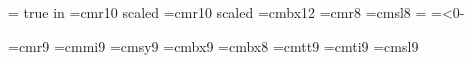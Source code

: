 %
%
\newif\iffiles
%
%
%
\newif\ifshutup\shutupfalse
\magnification=
 true in
\baselineskip
%
%
\def\PAR{\par}
%
%
\font\medfont=cmr10 scaled 
\font\bigfont=cmr10 scaled 
\font\sectfont=cmbx12
\def\small{\sevenrm}
\font\rhrm=cmr8
\font\rhit=cmsl8
%
%
\newcount\subsectno    %
\def\rhead{}           %
%
\def\newsection#1#2{%
\xdef\rhead{{\rhrm #1}\quad #2}%
\subsectno=0%
\iffiles
\write\conts{\string\sli\string{#1\string}\string{#2\string}\string{\the\pageno\string}}%
\fi
}
%
\def\section#1#2{\vskip 1 true in\goodbreak\newsection{#1}{#2}
\noindent{\sectfont #1\quad #2}\bigskip\noindent}
%
%
\newif\iftitle
\headline={\iftitle\hfil\global\titlefalse%
           \else{\hfil{\rhit \rhead}}%
           \fi}
\footline={\ifnum\pageno<0\hfil{\tenbf\romannumeral -\pageno}%
\else\hfil{\tenbf \number\pageno}\fi}
%
%
%

\font\ninerm=cmr9
\font\ninei=cmmi9
\font\ninesy=cmsy9
\font\ninebf=cmbx9
\font\eightbf=cmbx8
\font\ninett=cmtt9
\font\nineit=cmti9
\font\ninesl=cmsl9
\def\ninepoint{\def\rm{\fam0\ninerm}%
  \textfont0=\ninerm
  \textfont1=\ninei
  \textfont2=\ninesy
  \textfont3=\tenex
  \textfont\itfam=\nineit \def\it{\fam\itfam\nineit}%
  \textfont\slfam=\ninesl \def\sl{\fam\slfam\ninesl}%
  \textfont\ttfam=\ninett \def\tt{\fam\ttfam\ninett}%
  \textfont\bffam=\ninebf
  \normalbaselineskip=11pt
  \setbox\strutbox=\hbox{\vrule height8pt depth3pt width0pt}%
  \normalbaselines\rm}

\def\tenpoint{\def\rm{\fam0\tenrm}%
  \textfont0=\tenrm
  \textfont1=\teni
  \textfont2=\tensy
  \textfont3=\tenex
  \textfont\itfam=\tenit \def\it{\fam\itfam\tenit}%
  \textfont\slfam=\tensl \def\sl{\fam\slfam\tensl}%
  \textfont\ttfam=\tentt \def\tt{\fam\ttfam\tentt}%
  \textfont\bffam=\tenbf
  \normalbaselineskip=12pt
  \setbox\strutbox=\hbox{\vrule height8.5pt depth3.5pt width0pt}%
  \normalbaselines\rm}

